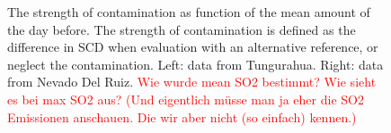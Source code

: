 \begin{figure}
	\caption{The strength of contamination as function of the mean  amount of the day before. The strength of contamination is defined as the difference in  SCD  when evaluation with an alternative reference, or neglect the contamination. Left: data from Tungurahua. Right: data from Nevado Del Ruiz. \textcolor{red}{Wie wurde mean SO2 bestimmt? Wie sieht es bei max SO2 aus? (Und eigentlich müsse man ja eher die SO2 Emissionen anschauen. Die wir aber nicht (so einfach) kennen.)}}
	\label{fig:contaminationdependencyso2}
\end{figure}
